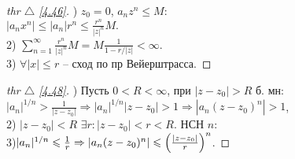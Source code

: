 
\begin{minipage}[t]{0.4\textwidth}
\begin{proof}[
thr $\triangle$
\eqref{4.46}]

\phantom{42}

) $z_0 = 0$, $a_n z^n \leq M$: \\
$|a_n x^n| \leq |a_n|r^n \leq \frac{r^n}{|z|^n} M.$ \\
2) $\sum_{n=1}^{\infty} \frac{r^n}{|z|^n} M = M \frac{1}{1 - r/|z|} < \infty$. \\
3) $\forall |x| \leq r$ -- сход по пр Вейерштрасса.
\end{proof}
\end{minipage}
\hfill
\begin{minipage}[t]{0.55\textwidth}
\begin{proof}[
thr \hypertarget{448link}{$\triangle$}
\eqref{4.48}]

\phantom{42}

) Пусть $0 < R < \infty$, при $|z-z_0| > R$ б. мн: \\
$|a_n|^{1/n} > \frac{1}{|z-z_0|} \Rightarrow |a_n|^{1/n} |z-z_0| > 1 \Rightarrow |a_n (z - z_0)^n| > 1$, \\
2) $|z-z_0| < R$ $\exists r \colon |z-z_0| < r < R$. НСН $n$: \\
3)$|a_n|^{1/n} \leqslant \frac{1}{r}  \Rightarrow |a_n (z-z_0)^n| \leqslant \left(\frac{|z - z_0|}{r}\right)^n$.
\end{proof}
\end{minipage}

\phantom{42}

